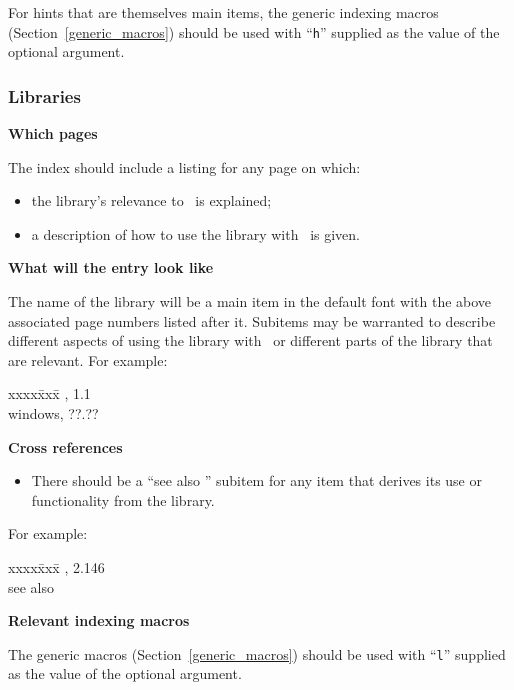\documentclass[11pt]{article}
\newenvironment{indexex}{\begin{tabbing}
xxxx\=xxx\=\kill}{\end{tabbing}}
\begin{document}
\begin{description}
        For hints that are themselves main items, the generic indexing
        macros (Section~\ref{generic_macros}) should be used with 
        ``{\tt h}'' supplied as the value of the optional argument.

\end{description}

\subsubsection{Libraries}%
\label{libraries}

\begin{description}
   \item{\bf Which pages}

         The index should include a listing for any page on which:
           \begin{itemize}
               \item the library's relevance to \cgal\ is explained;
               \item a description of how to use the library with \cgal\ is
                     given.
           \end{itemize}
   \item{\bf What will the entry look like}

         The name of the library will be a main item in the default font
         with the above associated page numbers listed after it.  
         Subitems may be warranted to describe different aspects of using the 
         library with \cgal\ or different parts of the library that are relevant.  
         For example:
         \begin{indexex}
         \leda,                                                     1.1  \\
         \>windows,                                                ??.?? \\
         \end{indexex} 
   \item{\bf Cross references} 

         \begin{itemize}
            \item There should be a ``see also ''
                  subitem for any item that derives its use or functionality
                  from the library.
         \end{itemize}
         For example:
         \begin{indexex}
         ,   2.146 \\
         \> see also \leda\ 
         \end{indexex}


   \item {\bf Relevant indexing macros}

         The generic macros (Section~\ref{generic_macros}) should be used 
         with ``{\tt l}'' supplied as the value of the optional argument.

\end{description}%
\end{document}
